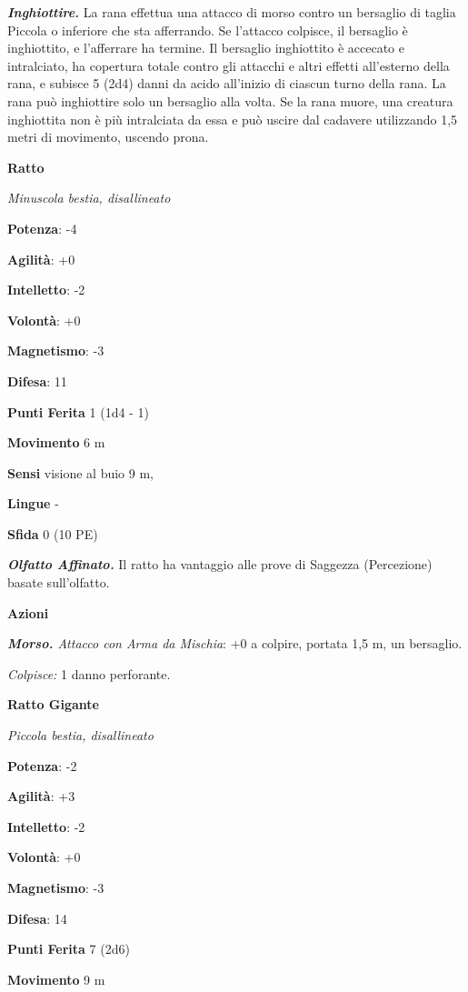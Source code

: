 \begin{multicols}{2}
\emph{\textbf{Inghiottire.}} La rana effettua una attacco di morso
contro un bersaglio di taglia Piccola o inferiore che sta afferrando. Se
l'attacco colpisce, il bersaglio è inghiottito, e l'afferrare ha
termine. Il bersaglio inghiottito è accecato e intralciato, ha copertura
totale contro gli attacchi e altri effetti all'esterno della rana, e
subisce 5 (2d4) danni da acido all'inizio di ciascun turno della rana.
La rana può inghiottire solo un bersaglio alla volta. Se la rana muore,
una creatura inghiottita non è più intralciata da essa e può uscire dal
cadavere utilizzando 1,5 metri di movimento, uscendo prona.



\textbf{Ratto}

\emph{Minuscola bestia, disallineato}

\textbf{Potenza}: -4

\textbf{Agilità}: +0

\textbf{Intelletto}: -2

\textbf{Volontà}: +0

\textbf{Magnetismo}: -3

\textbf{Difesa}: 11

\textbf{Punti Ferita} 1 (1d4 - 1)

\textbf{Movimento} 6 m

\textbf{Sensi} visione al buio 9 m, 

\textbf{Lingue} -

\textbf{Sfida} 0 (10 PE)

\emph{\textbf{Olfatto Affinato.}} Il ratto ha vantaggio alle prove di
Saggezza (Percezione) basate sull'olfatto.

\textbf{Azioni}

\emph{\textbf{Morso.} Attacco con Arma da Mischia}: +0 a colpire,
portata 1,5 m, un bersaglio.

\emph{Colpisce:} 1 danno perforante.

\textbf{Ratto Gigante}

\emph{Piccola bestia, disallineato}

\textbf{Potenza}: -2

\textbf{Agilità}: +3

\textbf{Intelletto}: -2

\textbf{Volontà}: +0

\textbf{Magnetismo}: -3

\textbf{Difesa}: 14

\textbf{Punti Ferita} 7 (2d6)

\textbf{Movimento} 9 m


\end{multicols}
